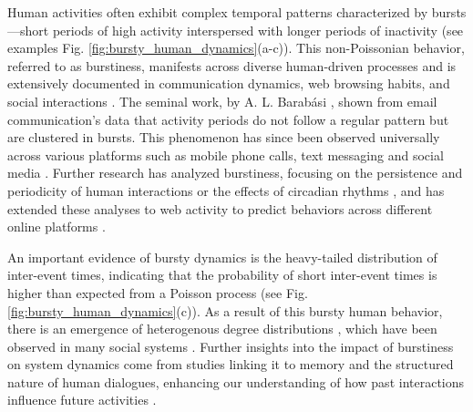 Human activities often exhibit complex temporal patterns characterized by bursts---short periods of high activity interspersed with longer periods of inactivity (see examples Fig. \ref{fig:bursty_human_dynamics}(a-c)). This non-Poissonian behavior, referred to as burstiness, manifests across diverse human-driven processes and is extensively documented in communication dynamics, web browsing habits, and social interactions \cite{Barabasi2005Bursts, Vazquez2006Bursts}. The seminal work, by A. L. Barabási \cite{Barabasi2005Bursts}, shown from email communication's data that activity periods do not follow a regular pattern but are clustered in bursts. This phenomenon has since been observed universally across various platforms such as mobile phone calls, text messaging and social media \cite{karsai-2011, Miritello2013Capacity,moro,artime-2017,rybski-2012,zignani-2016,kumar-2020,iribarren-2009}. Further research has analyzed burstiness, focusing on the persistence and periodicity of human interactions \cite{Clauset2007Proximity} or the effects of circadian rhythms \cite{Jo2012Circadian}, and has extended these analyses to web activity to predict behaviors across different online platforms \cite{Radicchi2009WebActivity}.

An important evidence of bursty dynamics is the heavy-tailed distribution of inter-event times, indicating that the probability of short inter-event times is higher than expected from a Poisson process (see Fig. \ref{fig:bursty_human_dynamics}(c)). As a result of this bursty human behavior, there is an emergence of heterogenous degree distributions \cite{Muchnik2013PowerLaw}, which have been observed in many social systems \cite{barabasi2009scale}. Further insights into the impact of burstiness on system dynamics come from studies linking it to memory and the structured nature of human dialogues, enhancing our understanding of how past interactions influence future activities \cite{karsai2012universal, Goh2008Burstiness, Eckmann2004Entropy}.

